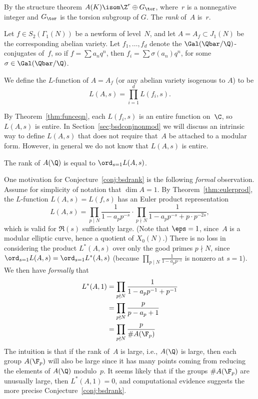 \documentclass{report}
\begin{document}
\begin{definition}[Rank]
  By the structure
  theorem $A(K)\isom \Z^r \oplus G_{\tor}$, where~$r$ is a nonnegative
  integer and $G_{\tor}$ is the torsion subgroup of $G$.  The {\em
    rank} of~$A$ is~$r$.
\end{definition}

Let $f \in S_2(\Gamma_1(N))$ be a newform of level~$N$, and let
$A=A_f\subset J_1(N)$ be the corresponding abelian variety.  Let
$f_1,\ldots, f_d$ denote the $\Gal(\Qbar/\Q)$-conjugates of~$f$, so if
$f=\sum a_n q^n$, then $f_i = \sum \sigma(a_n)q^n$, for some
$\sigma\in\Gal(\Qbar/\Q)$.

\begin{definition}[$L$-function of $A$]
We define the $L$-function of $A=A_f$ (or any abelian variety isogenous
to $A$) to be
$$
L(A,s) = \prod_{i=1}^d L(f_i,s).
$$
\end{definition}
By Theorem~\ref{thm:funceqn}, each $L(f_i,s)$ is an entire function
on~$\C$, so $L(A,s)$ is entire.  In Section~\ref{sec;bsdconjnonmod} we
will discuss an intrinsic way to define $L(A,s)$ that does not
require that~$A$ be attached to a modular form.   However, in
general we do not know that $L(A,s)$ is entire.


\begin{conjecture}\label{conj:bsdrank}
  The rank of $A(\Q)$ is equal to $\ord_{s=1}L(A,s)$.
\end{conjecture}

One motivation for Conjecture~\ref{conj:bsdrank} is the following {\em formal}
observation.  Assume for simplicity of notation that $\dim A=1$.  By
Theorem~\ref{thm:eulerprod}, the $L$-function $L(A,s)=L(f,s)$ has an
Euler product representation
$$
L(A,s) = \prod_{p\mid N} \frac{1}{1 - a_p p^{-s}}\cdot
  \prod_{p\nmid N}\frac{1}{1-a_p p^{-s} + p\cdot p^{-2s}},
$$
which is valid for $\Re(s)$ sufficiently large.
(Note that $\eps=1$, since~$A$ is a modular elliptic curve, hence
a quotient of $X_0(N)$.)
There is no loss in considering the product $L^*(A,s)$ over only
the good primes $p\nmid N$, since $\ord_{s=1}L(A,s) = \ord_{s=1} L^*(A,s)$
(because $\prod_{p\mid N} \frac{1}{1 - a_p p^{-s}}$ is nonzero at $s=1$).
We then have {\em formally} that
\begin{align*}
 L^*(A,1) &= \prod_{p\nmid N} \frac{1}{1-a_p p^{-1} + p^{-1}}\\
          &= \prod_{p\nmid N} \frac{p}{p - a_p + 1}\\
          &= \prod_{p\nmid N} \frac{p}{\# A(\F_p)}
\end{align*}
The intuition is that if the rank of~$A$ is large, i.e., $A(\Q)$ is
large, then each group $A(\F_p)$ will also be large since it has many
points coming from reducing the elements of $A(\Q)$ modulo~$p$.  It
seems likely that if the groups $\# A(\F_p)$ are unusually large, then
$L^*(A,1)=0$, and computational evidence suggests the more precise
Conjecture~\ref{conj:bsdrank}.
\end{document}
